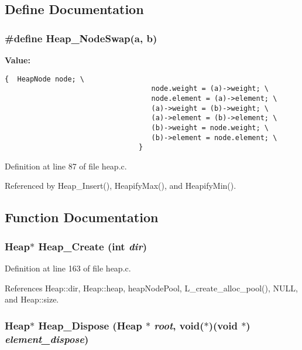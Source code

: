 \subsection{Define Documentation}
\subsubsection{\setlength{\rightskip}{0pt plus 5cm}\#define Heap\_\-Node\-Swap(a, b)}\label{heap_8c_a29c2de17062a14a403652431a2ccb2b}


\textbf{Value:}

\begin{Code}\begin{verbatim}{  HeapNode node; \
                                   node.weight = (a)->weight; \
                                   node.element = (a)->element; \
                                   (a)->weight = (b)->weight; \
                                   (a)->element = (b)->element; \
                                   (b)->weight = node.weight; \
                                   (b)->element = node.element; \
                                }
\end{verbatim}\end{Code}


Definition at line 87 of file heap.c.

Referenced by Heap\_\-Insert(), Heapify\-Max(), and Heapify\-Min().

\subsection{Function Documentation}
\subsubsection{\setlength{\rightskip}{0pt plus 5cm}\bf{Heap}$\ast$ Heap\_\-Create (int {\em dir})}\label{heap_8c_c4197167c9fa086c4654078a33edcfeb}




Definition at line 163 of file heap.c.

References Heap::dir, Heap::heap, heap\-Node\-Pool, L\_\-create\_\-alloc\_\-pool(), NULL, and Heap::size.
\subsubsection{\setlength{\rightskip}{0pt plus 5cm}\bf{Heap}$\ast$ Heap\_\-Dispose (\bf{Heap} $\ast$ {\em root}, void($\ast$)(void $\ast$) {\em element\_\-dispose})}\label{heap_8c_7b2694670d65b76abe0b706a2d94814f}




